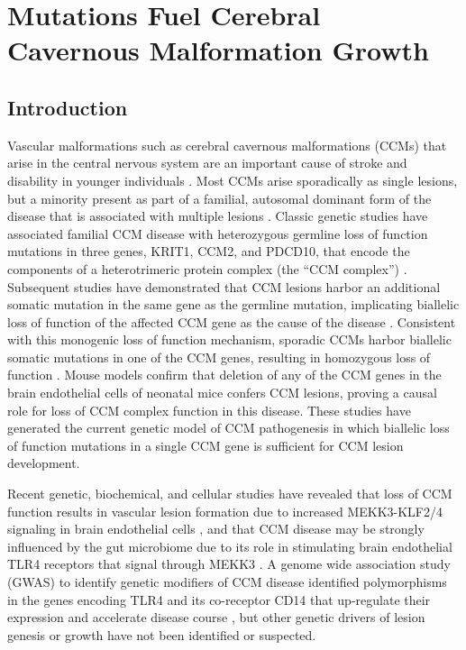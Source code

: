 \chapter{ Mutations Fuel Cerebral Cavernous Malformation Growth}
\label{chap:pik3ca}

\clearpage

\section{Introduction}
Vascular malformations such as cerebral cavernous malformations (CCMs) that arise in the central nervous system are an important cause of stroke and disability in younger individuals \citep{heiskanen1993, fischer2013}.  Most CCMs arise sporadically as single lesions, but a minority present as part of a familial, autosomal dominant form of the disease that is associated with multiple lesions \citep{cavalcanti2012}. Classic genetic studies have associated familial CCM disease with heterozygous germline loss of function mutations in three genes, KRIT1, CCM2, and PDCD10, that encode the components of a heterotrimeric protein complex (the “CCM complex”) \citep{fisher2014, plummer2005}. Subsequent studies have demonstrated that CCM lesions harbor an additional somatic mutation in the same gene as the germline mutation, implicating biallelic loss of function of the affected CCM gene as the cause of the disease \citep{gault2005, akers2009}. Consistent with this monogenic loss of function mechanism, sporadic CCMs harbor biallelic somatic mutations in one of the CCM genes, resulting in homozygous loss of function \citep{mcdonald2014}. Mouse models confirm that deletion of any of the CCM genes in the brain endothelial cells of neonatal mice confers CCM lesions, proving a causal role for loss of CCM complex function in this disease.  These studies have generated the current genetic model of CCM pathogenesis in which biallelic loss of function mutations in a single CCM gene is sufficient for CCM lesion development. 

Recent genetic, biochemical, and cellular studies have revealed that loss of CCM function results in vascular lesion formation due to increased MEKK3-KLF2/4 signaling in brain endothelial cells \citep{cullere2015, cuttano2015, zhou2016, renz2015}, and that CCM disease may be strongly influenced by the gut microbiome due to its role in stimulating brain endothelial TLR4 receptors that signal through MEKK3 \citep{tang2017, mcdonald2014, tang2019}. A genome wide association study (GWAS) to identify genetic modifiers of CCM disease identified polymorphisms in the genes encoding TLR4 and its co-receptor CD14 that up-regulate their expression and accelerate disease course \citep{choquet2014, tang2017}, but other genetic drivers of lesion genesis or growth have not been identified or suspected.

